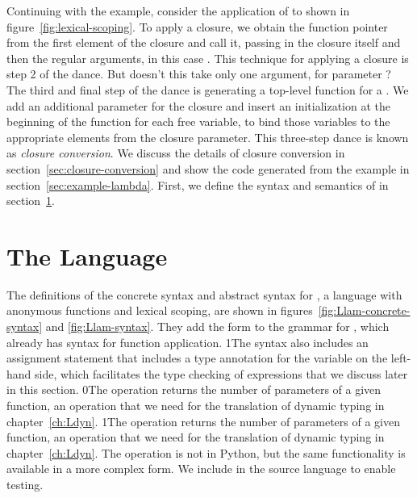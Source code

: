 \documentclass[7x10]{TimesAPriori_MIT}%
\def\racketEd{0}
\def\pythonEd{1}
\def\edition{1}
\newcommand{\racket}[1]{{\if\edition\racketEd{#1}\fi}}
\newcommand{\pythonColor}[0]{}
\newcommand{\python}[1]{{\if\edition\pythonEd\pythonColor #1\fi}}
\numberwithin{theorem}{chapter}
\numberwithin{definition}{chapter}
\numberwithin{equation}{chapter}
\begin{document}
Continuing with the example, consider the application of  to
 shown in figure~\ref{fig:lexical-scoping}.  To apply a
closure, we obtain the function pointer from the first element of the
closure and call it, passing in the closure itself and then the
regular arguments, in this case . This technique for applying
a closure is step 2 of the dance.
%
But doesn't this  take only one argument, for parameter
? The third and final step of the dance is generating a
top-level function for a .  We add an additional
parameter for the closure and insert an initialization at the beginning
of the function for each free variable, to bind those variables to the
appropriate elements from the closure parameter.
%
This three-step dance is known as \emph{closure
  conversion}. We discuss the
details of closure conversion in section~\ref{sec:closure-conversion}
and show the code generated from the example in
section~\ref{sec:example-lambda}. First, we define the syntax and
semantics of \LangLam{} in section~\ref{sec:r5}.

\section{The \LangLam{} Language}
\label{sec:r5}

The definitions of the concrete syntax and abstract syntax for
\LangLam{}, a language with anonymous functions and lexical scoping,
are shown in figures~\ref{fig:Llam-concrete-syntax} and
\ref{fig:Llam-syntax}. They add the  form to the grammar
for \LangFun{}, which already has syntax for function application.
%
\python{The syntax also includes an assignment statement that includes
  a type annotation for the variable on the left-hand side, which
  facilitates the type checking of \code{lambda} expressions that we
  discuss later in this section.}
%
\racket{The  operation returns the number of parameters
  of a given function, an operation that we need for the translation
  of dynamic typing in chapter~\ref{ch:Ldyn}.}
%
\python{The  operation returns the number of parameters of
  a given function, an operation that we need for the translation
  of dynamic typing in chapter~\ref{ch:Ldyn}.
  The \code{arity} operation is not in Python, but the same functionality
  is available in a more complex form. We include \code{arity} in the
  \LangLam{} source language to enable testing.}

\newcommand{\LlambdaGrammarRacket}{
  \begin{array}{lcl}
  \Exp &::=&  \CLAMBDA{\LP\LS\Var \key{:} \Type\RS\ldots\RP}{\Type}{\Exp} \\
    &\MID& \LP \key{procedure-arity}~\Exp\RP
  \end{array}
}
\newcommand{\LlambdaASTRacket}{
  \begin{array}{lcl}
  \Exp &::=& \LAMBDA{\LP\LS\Var\code{:}\Type\RS\ldots\RP}{\Type}{\Exp}\\
  \itm{op} &::=& \code{procedure-arity} 
  \end{array}
}
\end{document}
